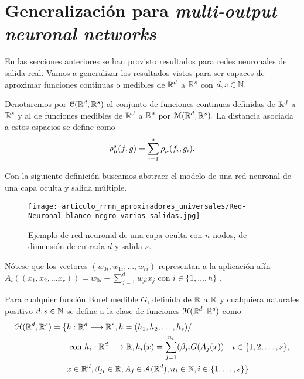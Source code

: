%
\section{Generalización para \textit{multi-output neuronal networks}}

En las secciones anteriores se han provisto resultados para redes 
neuronales de salida real. Vamos a generalizar los resultados vistos
para ser capaces de aproximar funciones continuas o medibles 
de $\mathbb{R}^d$ a $\mathbb{R}^s$ con $d,s \in \mathbb{N}.$

Denotaremos por $\mathcal{C}(\mathbb{R}^d ,\mathbb{R}^s)$ al conjunto de funciones continuas definidas de $\mathbb{R}^d$ a $\mathbb{R}^s$ y al de funciones medibles de 
$\mathbb{R}^d$ a $\mathbb{R}^s$  por $\mathcal{M}(\mathbb{R}^d , \mathbb{R}^s).$ 
La distancia asociada a estos espacios se define como 
\begin{equation}
    \rho_{\mu}^s(f,g) 
    =
    \sum_{i=1}^s \rho_{\mu}(f_i, g_i).
\end{equation}

Con la siguiente definición buscamos abstraer el modelo de una red neuronal de una capa oculta y salida múltiple.
\begin{figure}[h]
    \centering
    \texttt{[image: articulo\_rrnn\_aproximadores\_universales/Red-Neuronal-blanco-negro-varias-salidas.jpg]}
    \caption{Ejemplo de red neuronal de una capa oculta con $n$ nodos, de dimensión de entrada $d$ y salida $s$.}
    \label{fig:red neuronal-r-h-s}
\end{figure}

Nótese que los vectores $(w_{0i},w_{1 i}, \ldots, w_{r i})$ representan a la aplicación afín 
$A_i((x_1, x_2, \ldots x_r)) = w_{0i} + \sum_{j=1}^d w_{ji} x_j$
con $i \in \{1,\ldots, h\}$ . 

\begin{definicion} 
    Para cualquier función Borel medible $G$, definida de $\mathbb{R}$ a $\mathbb{R}$ y cualquiera naturales positivo
    $d,s \in \mathbb{N}$ se define a la clase de funciones $\mathcal{H}(\mathbb{R}^d,\mathbb{R}^s)$ como 
    \begin{equation}
        \begin{split}
        \mathcal{H}(\mathbb{R}^d,\mathbb{R}^s) = 
        \{ 
            & h: \mathbb{R} ^d \longrightarrow \mathbb{R}^s, h= (h_1, h_2, \ldots, h_s)  / \quad 
            \\ &
            \text{ con } h_i : \mathbb{R} ^d\longrightarrow \mathbb{R}, 
            h_i(x)=\sum_{j = 1} ^{n_i} (
            \beta_{j i} G(A_{j}(x)) \quad i \in \{1,2,\ldots, s\}, \\
            & x  \in \mathbb{R} ^d, \beta_{j i} \in \mathbb{R}, A_{j}\in \mathcal{A}(\mathbb{R}^d),n_i \in \mathbb{N}, i \in \{1,\ldots, s\} 
        \}.
        \end{split}
    \end{equation}
\end{definicion}


